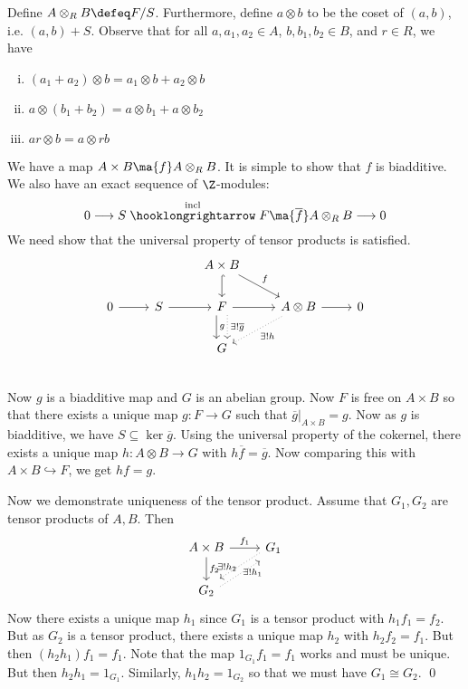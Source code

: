 Define $A \otimes_R B \defeq F/S$. Furthermore, define $a \otimes b$ to be the coset of $(a,b)$, i.e. $(a,b)+S$. Observe that for all $a,a_1,a_2 \in A$, $b,b_1,b_2 \in B$, and $r \in R$, we have
\begin{enumerate}[(i)]
\item $(a_1+a_2) \otimes b=a_1\otimes b+a_2 \otimes b$
\item $a\otimes (b_1+b_2)=a\otimes b_1+a\otimes b_2$
\item $ar \otimes b=a \otimes rb$
\end{enumerate}

We have a map $A \times B \ma{f} A \otimes_R B$. It is simple to show that $f$ is biadditive. We also have an exact sequence of $\Z$-modules:
\[
0 \longrightarrow S \stackrel{\text{incl}}{\hooklongrightarrow} F \ma{\overline{f}} A \otimes_R B \longrightarrow 0
\]
We need show that the universal property of tensor products is satisfied.
\[
\begin{tikzcd}
 \;  &  \;  & A \times B \arrow{dr}{f} \arrow[hookrightarrow]{d} &   &   \\
0 \arrow{r} & S \arrow{r} & F \arrow{r} \arrow[shift right=1ex]{d}{g} \arrow[dotted, shift left=1ex]{d}{\exists! \overline{g}} & A \otimes B \arrow{r} \arrow[dotted]{dl}{\exists! h} & 0 \\
   &    & G &   &   \\
\end{tikzcd}
\]
Now $g$ is a biadditive map and $G$ is an abelian group. Now $F$ is free on $A \times B$ so that there exists a unique map $g: F \rightarrow G$ such that $\overline{g}|_{A\times B}=g$. Now as $g$ is biadditive, we have $S \subseteq \ker \overline{g}$. Using the universal property of the cokernel, there exists a unique map $h: A \otimes B \rightarrow G$ with $h\overline{f}=\overline{g}$. Now comparing this with $A \times B \hookrightarrow F$, we get $hf=g$. 

Now we demonstrate uniqueness of the tensor product. Assume that $G_1,G_2$ are tensor products of $A,B$. Then
\[
\begin{tikzcd}
A \times B \arrow{r}{f_1} \arrow{d}{f_2} & G_1 \arrow[dotted, yshift=0.7ex]{dl}{\exists! h_1} \\
G_2 \arrow[dotted,yshift=-0.8ex]{ur}{\exists! h_2} &
\end{tikzcd}
\]
Now there exists a unique map $h_1$ since $G_1$ is a tensor product with $h_1f_1=f_2$. But as $G_2$ is a tensor product, there exists a unique map $h_2$ with $h_2f_2=f_1$. But then $(h_2h_1)f_1=f_1$. Note that the map $1_{G_1}f_1=f_1$ works and must be unique. But then $h_2h_1=1_{G_1}$. Similarly, $h_1h_2=1_{G_2}$ so that we must have $G_1 \cong G_2$. \qed \\

